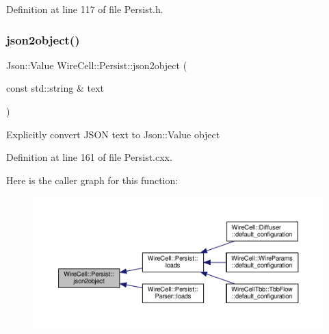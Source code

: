 Definition at line 117 of file Persist.\+h.

\mbox{\label{namespace_wire_cell_1_1_persist_a25359fd9189802ba07dce1de7e450315}} 
\subsubsection{\texorpdfstring{json2object()}{json2object()}}
{\footnotesize\ttfamily Json\+::\+Value Wire\+Cell\+::\+Persist\+::json2object (\begin{DoxyParamCaption}\item[{const std\+::string \&}]{text }\end{DoxyParamCaption})}

Explicitly convert J\+S\+ON text to Json\+::\+Value object 

Definition at line 161 of file Persist.\+cxx.

Here is the caller graph for this function\+:
\nopagebreak
\begin{figure}[H]
\begin{center}
\leavevmode
\includegraphics[width=350pt]{namespace_wire_cell_1_1_persist_a25359fd9189802ba07dce1de7e450315_icgraph}
\end{center}
\end{figure}
\mbox{\label{namespace_wire_cell_1_1_persist_ab922ff3e9c80bcbc9d4e8342f7d3223d}} 
